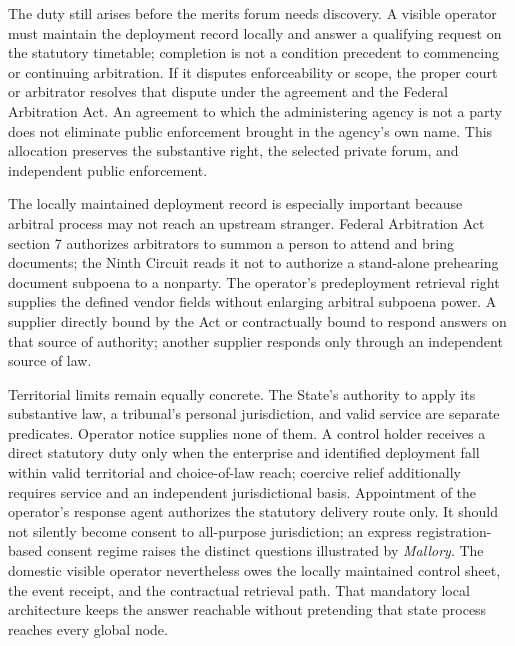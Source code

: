 The duty still arises before the merits forum needs discovery. A visible operator must maintain the deployment record locally and answer a qualifying request on the statutory timetable; completion is not a condition precedent to commencing or continuing arbitration. If it disputes enforceability or scope, the proper court or arbitrator resolves that dispute under the agreement and the Federal Arbitration Act. An agreement to which the administering agency is not a party does not eliminate public enforcement brought in the agency's own name. This allocation preserves the substantive right, the selected private forum, and independent public enforcement.

The locally maintained deployment record is especially important because arbitral process may not reach an upstream stranger. Federal Arbitration Act section 7 authorizes arbitrators to summon a person to attend and bring documents; the Ninth Circuit reads it not to authorize a stand-alone prehearing document subpoena to a nonparty. The operator's predeployment retrieval right supplies the defined vendor fields without enlarging arbitral subpoena power. A supplier directly bound by the Act or contractually bound to respond answers on that source of authority; another supplier responds only through an independent source of law.

Territorial limits remain equally concrete. The State's authority to apply its substantive law, a tribunal's personal jurisdiction, and valid service are separate predicates. Operator notice supplies none of them. A control holder receives a direct statutory duty only when the enterprise and identified deployment fall within valid territorial and choice-of-law reach; coercive relief additionally requires service and an independent jurisdictional basis. Appointment of the operator's response agent authorizes the statutory delivery route only. It should not silently become consent to all-purpose jurisdiction; an express registration-based consent regime raises the distinct questions illustrated by \emph{Mallory}. The domestic visible operator nevertheless owes the locally maintained control sheet, the event receipt, and the contractual retrieval path. That mandatory local architecture keeps the answer reachable without pretending that state process reaches every global node.

